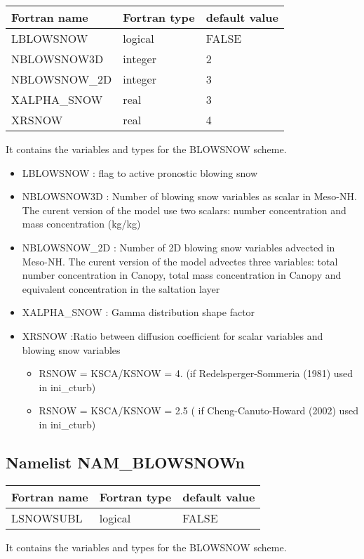 \begin{center}
\begin{tabular} {|l|l|l|}
\hline
Fortran name & Fortran type & default value \\
\hline

LBLOWSNOW    & logical & FALSE     \\
NBLOWSNOW3D  & integer & 2         \\
NBLOWSNOW\_2D& integer & 3       \\
XALPHA\_SNOW & real    &3 \\
XRSNOW       & real    & 4\\
\hline
\end{tabular}
\end{center}
It contains the variables and types for the BLOWSNOW scheme.

\begin{itemize}
\item LBLOWSNOW : flag to active pronostic blowing snow 
\item NBLOWSNOW3D : Number of blowing snow variables as scalar in Meso-NH. The curent version of the model use two scalars:
number concentration and mass concentration (kg/kg)
\item NBLOWSNOW\_2D :  Number of 2D blowing snow variables advected in Meso-NH. The curent version of the model advectes three variables: total number concentration in Canopy, total mass concentration in Canopy and equivalent concentration in the saltation layer

\item XALPHA\_SNOW : Gamma distribution shape factor
\item XRSNOW :Ratio between diffusion coefficient for scalar variables and blowing snow variables
\begin{itemize}
	\item RSNOW = KSCA/KSNOW = 4. (if Redelsperger-Sommeria (1981) used in ini\_cturb)
	\item RSNOW = KSCA/KSNOW = 2.5 ( if Cheng-Canuto-Howard (2002) used in ini\_cturb)
\end{itemize}
\end{itemize}

\subsection{Namelist NAM\_BLOWSNOWn }
\begin{center}
\begin{tabular} {|l|l|l|}
\hline
Fortran name & Fortran type & default value \\
\hline

LSNOWSUBL  & logical & FALSE     \\
\hline
\end{tabular}
\end{center}
It contains the variables and types for the BLOWSNOW scheme.


